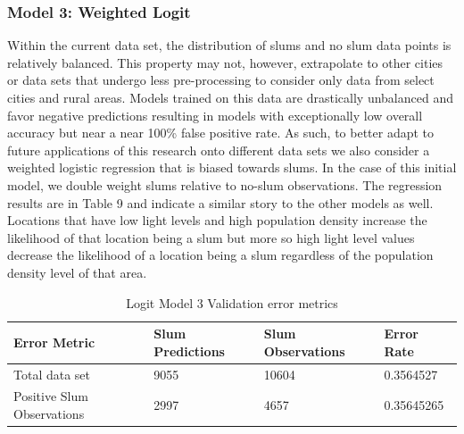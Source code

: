 \subsubsection{Model 3: Weighted Logit}



Within the current data set, the distribution of slums and no slum data points is relatively balanced. This property may not, however, extrapolate to other cities or data sets that undergo less pre-processing to consider only data from select cities and rural areas. Models trained on this data are drastically unbalanced and favor negative predictions resulting in models with exceptionally low overall accuracy but near a near 100\% false positive rate. As such, to better adapt to future applications of this research onto different data sets we also consider a weighted logistic regression that is biased towards slums. In the case of this initial model, we double weight slums relative to no-slum observations. The regression results are in Table 9 and indicate a similar story to the other models as well. Locations that have low light levels and high population density increase the likelihood of that location being a slum but more so high light level values decrease the likelihood of a location being a slum regardless of the population density level of that area.

\begin{table}[ht]
\centering
\caption{Logit Model 3 Validation error metrics}
\begin{tabular}{llll}
  \hline \hline
  Error Metric &  Slum Predictions &  Slum Observations  & Error Rate \\ 
  \hline
Total data set & 9055 & 10604 & 0.3564527 \\ 
Positive Slum Observations & 2997 & 4657 & 0.35645265\\
   \hline
\end{tabular}
\end{table}

